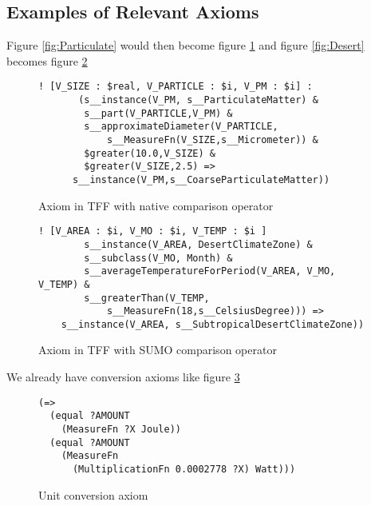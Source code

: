 \documentclass{article}
\begin{document}
\subsection{Examples of Relevant Axioms}

Figure \ref{fig:Particulate} would then become figure \ref{fig:TFFParticulateArith} and 
figure \ref{fig:Desert} becomes figure \ref{fig:TFFParticulateArithSUMO}

\begin{figure}[H]
\begin{framed}
\begin{verbatim}
! [V_SIZE : $real, V_PARTICLE : $i, V_PM : $i] :
       (s__instance(V_PM, s__ParticulateMatter) &
        s__part(V_PARTICLE,V_PM) &
        s__approximateDiameter(V_PARTICLE,
            s__MeasureFn(V_SIZE,s__Micrometer)) &
        $greater(10.0,V_SIZE) &
        $greater(V_SIZE,2.5) =>
      s__instance(V_PM,s__CoarseParticulateMatter))
\end{verbatim}
\end{framed}
\caption{Axiom in TFF with native comparison operator}
\label{fig:TFFParticulateArith}
\end{figure}

\begin{figure}[H]
\begin{framed}
\begin{verbatim}
! [V_AREA : $i, V_MO : $i, V_TEMP : $i ]
        s__instance(V_AREA, DesertClimateZone) &
        s__subclass(V_MO, Month) &
        s__averageTemperatureForPeriod(V_AREA, V_MO, V_TEMP) &
        s__greaterThan(V_TEMP,
            s__MeasureFn(18,s__CelsiusDegree))) =>
    s__instance(V_AREA, s__SubtropicalDesertClimateZone))
\end{verbatim}
\end{framed}
\caption{Axiom in TFF with SUMO comparison operator}
\label{fig:TFFParticulateArithSUMO}
\end{figure}

We already have conversion axioms like figure \ref{fig:Joule}

\begin{figure}[H]
\begin{framed}
\begin{verbatim}
(=>
  (equal ?AMOUNT
    (MeasureFn ?X Joule))
  (equal ?AMOUNT
    (MeasureFn
      (MultiplicationFn 0.0002778 ?X) Watt)))
\end{verbatim}
\end{framed}
\caption{Unit conversion axiom}
\label{fig:Joule}
\end{figure}
\end{document}
